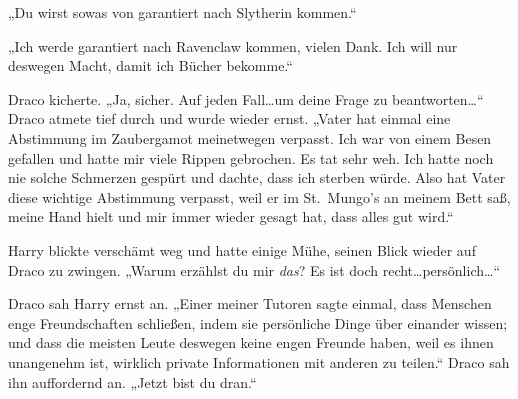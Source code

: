„Du wirst sowas von garantiert nach Slytherin kommen.“

„Ich werde garantiert nach Ravenclaw kommen, vielen Dank. Ich will nur deswegen Macht, damit ich Bücher bekomme.“

Draco kicherte. „Ja, sicher. Auf jeden Fall…um deine Frage zu beantworten…“ Draco atmete tief durch und wurde wieder ernst. „Vater hat einmal eine Abstimmung im Zaubergamot meinetwegen verpasst. Ich war von einem Besen gefallen und hatte mir viele Rippen gebrochen. Es tat sehr weh. Ich hatte noch nie solche Schmerzen gespürt und dachte, dass ich sterben würde. Also hat Vater diese wichtige Abstimmung verpasst, weil er im St.~Mungo’s an meinem Bett saß, meine Hand hielt und mir immer wieder gesagt hat, dass alles gut wird.“

Harry blickte verschämt weg und hatte einige Mühe, seinen Blick wieder auf Draco zu zwingen. „Warum erzählst du mir \emph{das}? Es ist doch recht…persönlich…“

Draco sah Harry ernst an. „Einer meiner Tutoren sagte einmal, dass Menschen enge Freundschaften schließen, indem sie persönliche Dinge über einander wissen; und dass die meisten Leute deswegen keine engen Freunde haben, weil es ihnen unangenehm ist, wirklich private Informationen mit anderen zu teilen.“ Draco sah ihn auffordernd an. „Jetzt bist du dran.“

